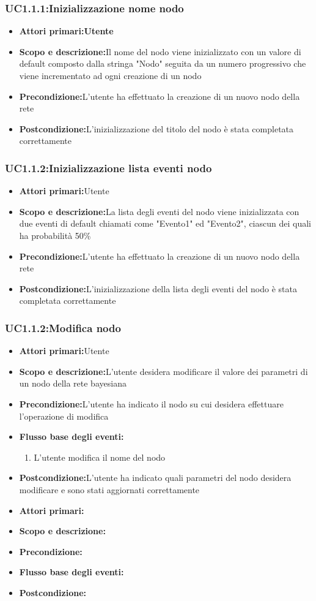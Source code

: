 \subsubsection{UC1.1.1:Inizializzazione nome nodo}
\begin{itemize}
	\item{\textbf{Attori primari:Utente}}
	\item{\textbf{Scopo e descrizione:}Il nome del nodo viene inizializzato con un valore di default composto dalla stringa "Nodo" seguita da un numero progressivo che viene incrementato ad ogni creazione di un nodo}
	\item{\textbf{Precondizione:}L'utente ha effettuato la creazione di un nuovo nodo della rete}
	\item{\textbf{Postcondizione:}L'inizializzazione del titolo del nodo è stata completata correttamente}
\end{itemize}
\subsubsection{UC1.1.2:Inizializzazione lista eventi nodo}
\begin{itemize}
	\item{\textbf{Attori primari:}Utente}
	\item{\textbf{Scopo e descrizione:}La lista degli eventi del nodo viene inizializzata con due eventi di default chiamati come "Evento1" ed "Evento2", ciascun dei quali ha probabilità 50\%}
	\item{\textbf{Precondizione:}L'utente ha effettuato la creazione di un nuovo nodo della rete}
	\item{\textbf{Postcondizione:}L'inizializzazione della lista degli eventi del nodo è stata completata correttamente}
\end{itemize}
\subsubsection{UC1.1.2:Modifica nodo}
\begin{itemize}
	\item{\textbf{Attori primari:}Utente}
	\item{\textbf{Scopo e descrizione:}L'utente desidera modificare il valore dei parametri di un nodo della rete bayesiana}
	\item{\textbf{Precondizione:}L'utente ha indicato il nodo su cui desidera effettuare l'operazione di modifica}
	\item{\textbf{Flusso base degli eventi:}}
		\begin{enumerate}
			\item{L'utente modifica il nome del nodo}		
		\end{enumerate}
	\item{\textbf{Postcondizione:}L'utente ha indicato quali parametri del nodo desidera modificare e sono stati aggiornati correttamente}
\end{itemize}


\begin{itemize}
	\item{\textbf{Attori primari:}}
	\item{\textbf{Scopo e descrizione:}}
	\item{\textbf{Precondizione:}}
	\item{\textbf{Flusso base degli eventi:}}

	\item{\textbf{Postcondizione:}}
\end{itemize}
